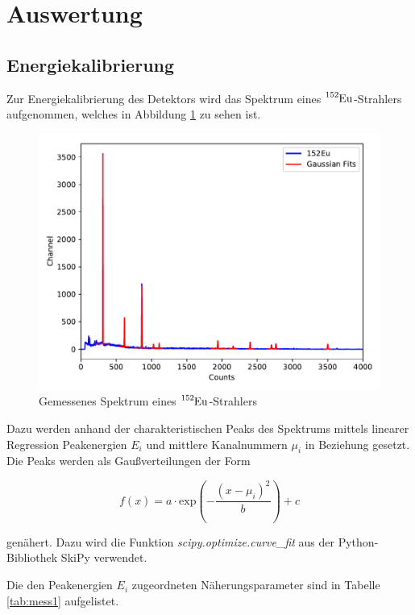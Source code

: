 \section{Auswertung}
\label{sec:Auswertung}

\subsection{Energiekalibrierung}

Zur Energiekalibrierung des Detektors wird das Spektrum eines $\ce{^{152}Eu}$-Strahlers aufgenommen, welches in Abbildung
\ref{fig:plot1} zu sehen ist.

\begin{figure}
  \centering
  \includegraphics{content/plot1.pdf}
  \caption{Gemessenes Spektrum eines $\ce{^{152}Eu}$-Strahlers}
  \label{fig:plot1}
\end{figure}

Dazu werden anhand der charakteristischen Peaks des Spektrums mittels linearer Regression Peakenergien $E_i$ und mittlere 
Kanalnummern $\mu_i$ in Beziehung gesetzt.
Die Peaks werden als Gaußverteilungen der Form 

\begin{equation}
  f(x) = a \cdot \text{exp}\left( - \frac{(x-\mu_i)^2}{b}\right) + c
\end{equation}

genähert. Dazu wird die Funktion \textit{scipy.optimize.curve\_fit} aus der Python-Bibliothek SkiPy verwendet.

Die den Peakenergien $E_i$ zugeordneten Näherungsparameter sind in Tabelle \ref{tab:mess1} aufgelistet.

